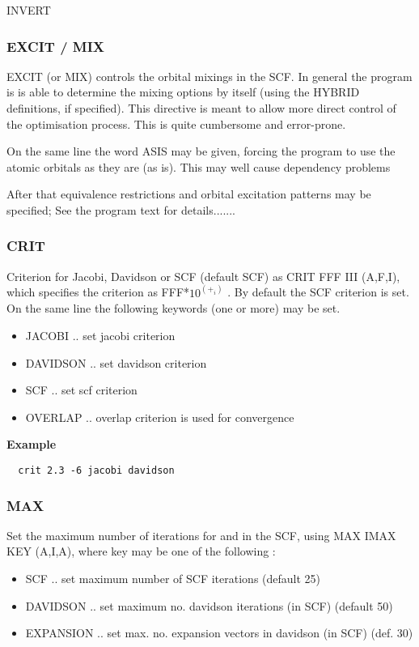\documentclass[11pt,fleqn]{article}
\begin{document}
INVERT

\subsubsection{EXCIT / MIX}

EXCIT (or MIX) controls the orbital mixings in the SCF. In general the 
program is is able to determine the mixing options by itself (using the 
HYBRID definitions, if specified). This directive is meant to allow 
more direct control of the optimisation process. 
This is quite cumbersome and error-prone.

On the same line the word ASIS may be given, forcing the program to use the 
atomic orbitals as they are (as is). This may well cause dependency problems

After that equivalence restrictions and orbital excitation patterns may be
specified; See the program text for details.......


\subsubsection{CRIT}

Criterion for Jacobi, Davidson or SCF (default SCF) as CRIT FFF III (A,F,I), 
which specifies the criterion as FFF*$10^(+_i)$ . By default the SCF criterion 
is set.  On the same line the following keywords (one or more) may be set.

\begin{itemize}
\item JACOBI     .. set jacobi criterion 
\item DAVIDSON   .. set davidson criterion 
\item SCF        .. set scf criterion 
\item OVERLAP	 .. overlap criterion is used for convergence
\end{itemize}

{\bf Example}
\begin{verbatim}
  crit 2.3 -6 jacobi davidson
\end{verbatim}

\subsubsection{MAX}

Set the maximum number of iterations for and in the SCF,  using MAX IMAX KEY
(A,I,A), where key may be one of the following :

\begin{itemize}
\item SCF        .. set maximum number of SCF iterations  (default 25)
\item DAVIDSON   .. set maximum no.  davidson iterations (in SCF) (default 50)
\item EXPANSION	 .. set max. no. expansion vectors in davidson (in SCF) (def. 30)
\end{itemize}
\end{document}
